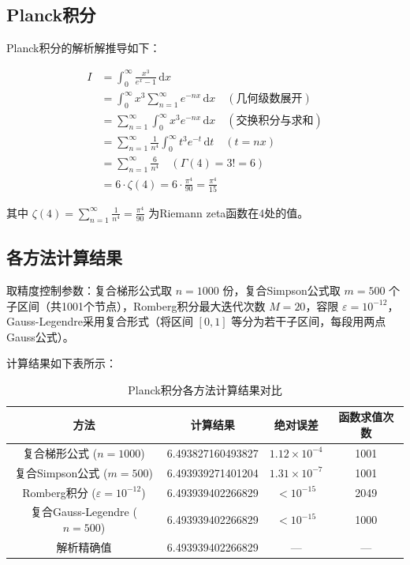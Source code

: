 \documentclass{article}
\begin{document}
\subsection{Planck积分}

Planck积分的解析解推导如下：

\begin{align}
I &= \int_0^\infty \frac{x^3}{e^x - 1} \, \mathrm{d}x \\
&= \int_0^\infty x^3 \sum_{n=1}^\infty e^{-nx} \, \mathrm{d}x \quad (\text{几何级数展开}) \\
&= \sum_{n=1}^\infty \int_0^\infty x^3 e^{-nx} \, \mathrm{d}x \quad (\text{交换积分与求和}) \\
&= \sum_{n=1}^\infty \frac{1}{n^4} \int_0^\infty t^3 e^{-t} \, \mathrm{d}t \quad (t = nx) \\
&= \sum_{n=1}^\infty \frac{6}{n^4} \quad (\Gamma(4) = 3! = 6) \\
&= 6 \cdot \zeta(4) = 6 \cdot \frac{\pi^4}{90} = \frac{\pi^4}{15}
\end{align}

其中 $\zeta(4) = \sum_{n=1}^\infty \frac{1}{n^4} = \frac{\pi^4}{90}$ 为Riemann zeta函数在4处的值。

\subsection{各方法计算结果}
取精度控制参数：复合梯形公式取 \(n=1000\) 份，复合Simpson公式取 \(m=500\) 个子区间（共1001个节点），Romberg积分最大迭代次数 \(M=20\)，容限 \(\varepsilon=10^{-12}\)，Gauss-Legendre采用复合形式（将区间 \([0,1]\) 等分为若干子区间，每段用两点Gauss公式）。

计算结果如下表所示：

\begin{table}[H]
\centering
\caption{Planck积分各方法计算结果对比}
\begin{tabular}{cccc}
\toprule
方法 & 计算结果 & 绝对误差 & 函数求值次数 \\
\midrule
复合梯形公式 ($n=1000$) & 6.493827160493827 & $1.12\times10^{-4}$ & 1001 \\
复合Simpson公式 ($m=500$) & 6.493939271401204 & $1.31\times10^{-7}$ & 1001 \\
Romberg积分 ($\varepsilon=10^{-12}$) & 6.493939402266829 & $<10^{-15}$ & 2049 \\
复合Gauss-Legendre ($n=500$) & 6.493939402266829 & $<10^{-15}$ & 1000 \\
解析精确值 & 6.493939402266829 & — & — \\
\bottomrule
\end{tabular}
\end{table}
\end{document}
